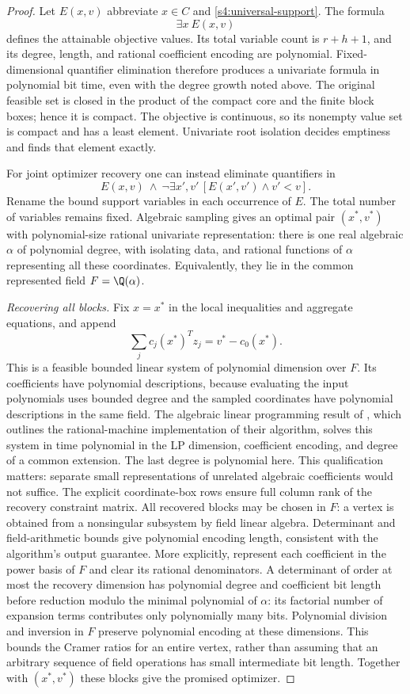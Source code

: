 \begin{proof}
Let $E(x,v)$ abbreviate $x\in C$ and
\eqref{s4:universal-support}. The formula
\[
 \exists x\ E(x,v)
\]
defines the attainable objective values. Its total variable count is
$r+h+1$, and its degree, length, and rational coefficient encoding
are polynomial. Fixed-dimensional quantifier elimination therefore
produces a univariate formula in polynomial bit time, even with the
degree growth noted above. The original feasible set is closed in the
product of the compact core and the finite block boxes; hence it is
compact. The objective is continuous, so its nonempty value set is
compact and has a least element. Univariate root isolation decides
emptiness and finds that element exactly.

For joint optimizer recovery one can instead eliminate quantifiers in
\begin{equation}
 E(x,v)\ \wedge\
 \neg\exists x',v'\,[E(x',v')\wedge v'<v].
 \label{s4:optimal-sample}
\end{equation}
Rename the bound support variables in each occurrence of $E$.
The total number of variables remains fixed. Algebraic sampling gives
an optimal pair $(x^*,v^*)$ with polynomial-size rational univariate
representation: there is one real algebraic $\alpha$ of polynomial
degree, with isolating data, and rational functions of $\alpha$
representing all these coordinates. Equivalently, they lie in the
common represented field $F=\Q(\alpha)$.

\emph{Recovering all blocks.}
Fix $x=x^*$ in the local inequalities and aggregate equations, and
append
\[
 \sum_jc_j(x^*)^Tz_j=v^*-c_0(x^*).
\]
This is a feasible bounded linear system of polynomial dimension over
$F$. Its coefficients have polynomial descriptions, because evaluating
the input polynomials uses bounded degree and the sampled coordinates
have polynomial descriptions in the same field. The algebraic linear
programming result of \citet[Section~5, Remark~1]{s4:adler1994},
which outlines the rational-machine implementation of their algorithm,
solves this system in time polynomial in the LP dimension, coefficient
encoding, and degree of a common extension. The last degree is
polynomial here. This qualification matters: separate small
representations of unrelated algebraic coefficients would not suffice.
The explicit coordinate-box rows ensure full column rank of the
recovery constraint matrix. All recovered blocks may be chosen in $F$: a vertex is obtained from
a nonsingular subsystem by field linear algebra. Determinant and
field-arithmetic bounds give polynomial encoding length, consistent
with the algorithm's output guarantee. More explicitly, represent each
coefficient in the power basis of $F$ and clear its rational
denominators. A determinant of order at most the recovery dimension
has polynomial degree and coefficient bit length before reduction modulo
the minimal polynomial of $\alpha$: its factorial number of expansion
terms contributes only polynomially many bits. Polynomial division and
inversion in $F$ preserve polynomial encoding at these dimensions.
This bounds the Cramer ratios for an entire vertex, rather than
assuming that an arbitrary sequence of field operations has small
intermediate bit length. Together with $(x^*,v^*)$ these
blocks give the promised optimizer.


\end{proof}
